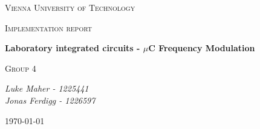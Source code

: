 
\begin{titlepage}
	\centering
	{\scshape\LARGE Vienna University of Technology \par}
	\vspace{1cm}
	{\scshape\Large Implementation report \par}
	\vspace{1.5cm}
	{\huge\bfseries Laboratory integrated circuits - $\mu$C Frequency Modulation \par}
	\vspace{2cm}
	{\scshape\Large Group 4 \par}
	\vspace{1.5cm}
	{\Large\itshape Luke Maher - 1225441 \\ Jonas Ferdigg - 1226597 \par}
	\vfill

	{\large \today\par}
\end{titlepage}

